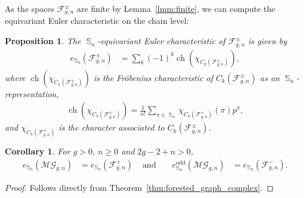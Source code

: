 \documentclass[oneside]{amsart}
\newtheorem{corollary}[theorem]{Corollary}
\newtheorem{proposition}[theorem]{Proposition}
\theoremstyle{remark}
\DeclareMathOperator{\SG}{{\mathbb S}}
\newcommand{\ch}{\operatorname{ch}}
\newcommand{\MG}{\mathcal{MG}}
\newcommand{\F}{\mathcal{F}}
\begin{document}
%
%
%
%
%
%
%
%
%
%
%
%
%
%
%
%
%
%
%
%
%
%
%
%
%
%
%
%
%
%
%
%
%
%
%
%
%
%
%
%
%
%
%
%
%
%
%
%
%
%
%
%
%
%
%
%
%
%

%

%

As the spaces $\F_{g,n}^\pm$ are finite by  Lemma~\ref{lmm:finite},
we can compute the equivariant Euler characteristic 
on the chain level:
\begin{proposition}
\label{prop:equivC}
The $\SG_n$-equivariant Euler characteristic of $\F_{g,n}^\pm$ is given by 
\begin{align*} e_{\SG_n}(\F_{g,n}^\pm) &= \sum_k (-1)^k \ch(\chi_{C_k(\F^\pm_{g,n})}), \end{align*}
where $\ch(\chi_{C_k(\F^\pm_{g,n})})$
is the Fr\"obenius characteristic of $C_k(\F^\pm_{g,n})$ as an $\SG_n$-representation,
\begin{align*} \ch(\chi_{C_k(\F^\pm_{g,n})}) = \frac{1}{n!} \sum_{\pi \in \SG_n} \chi_{C_k(\F^\pm_{g,n})}(\pi) p^\pi, \end{align*}
and $\chi_{C_k(\F^\pm_{g,n})}$ 
is the \emph{character} associated to $C_k(\F^\pm_{g,n})$.
\end{proposition}
%
%
%

\begin{corollary}
\label{cor:MGF}
For $g > 0$,  $n\geq 0$ and $2g-2+n > 0$,
\begin{align*} e_{\SG_n}(\MG_{g,n}) &= e_{\SG_n}(\F_{g,n}^+) &\text{ and }&& e^\mathrm{odd}_{\SG_n}(\MG_{g,n}) &= e_{\SG_n}(\F_{g,n}^-) . \end{align*}
\end{corollary}
\begin{proof}
Follows directly from Theorem~\ref{thm:forested_graph_complex}.
\end{proof}
\end{document}

